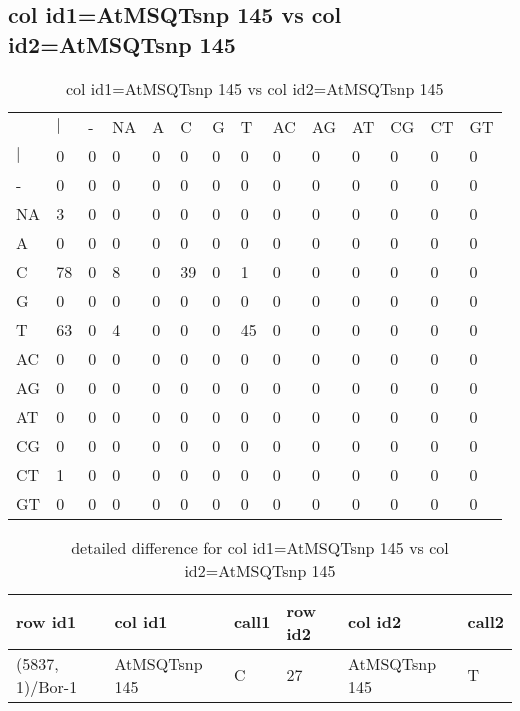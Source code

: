 \subsection{col id1=AtMSQTsnp 145 vs col id2=AtMSQTsnp 145}
\begin{center}
\begin{longtable}{|l|l|l|l|l|l|l|l|l|l|l|l|l|l|}
\caption{col id1=AtMSQTsnp 145 vs col id2=AtMSQTsnp 145} \label{table_dm526}\\
\hline
\\
\hline
&$|$&-&NA&A&C&G&T&AC&AG&AT&CG&CT&GT\\
$|$&0&0&0&0&0&0&0&0&0&0&0&0&0\\
-&0&0&0&0&0&0&0&0&0&0&0&0&0\\
NA&3&0&0&0&0&0&0&0&0&0&0&0&0\\
A&0&0&0&0&0&0&0&0&0&0&0&0&0\\
C&78&0&8&0&39&0&1&0&0&0&0&0&0\\
G&0&0&0&0&0&0&0&0&0&0&0&0&0\\
T&63&0&4&0&0&0&45&0&0&0&0&0&0\\
AC&0&0&0&0&0&0&0&0&0&0&0&0&0\\
AG&0&0&0&0&0&0&0&0&0&0&0&0&0\\
AT&0&0&0&0&0&0&0&0&0&0&0&0&0\\
CG&0&0&0&0&0&0&0&0&0&0&0&0&0\\
CT&1&0&0&0&0&0&0&0&0&0&0&0&0\\
GT&0&0&0&0&0&0&0&0&0&0&0&0&0\\
\hline
\end{longtable}
\end{center}

\begin{center}
\begin{longtable}{|l|l|l|l|l|l|}
\caption{detailed difference for col id1=AtMSQTsnp 145 vs col id2=AtMSQTsnp 145} \label{table_dm527}\\
\hline
row id1&col id1&call1&row id2&col id2&call2\\
\hline
(5837, 1)/Bor-1&AtMSQTsnp 145&C&27&AtMSQTsnp 145&T\\
\hline
\end{longtable}
\end{center}

